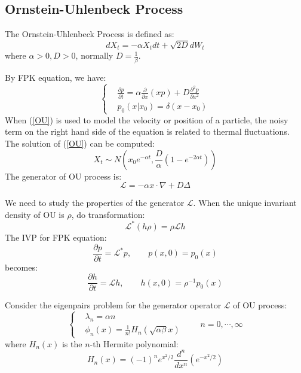 \subsection{Ornstein-Uhlenbeck Process}
\begin{definition}
    The Ornstein-Uhlenbeck Process is defined as:
    \begin{equation}
        dX_t = -\alpha X_t dt+\sqrt{2D} dW_t
    \end{equation}
    where $\alpha>0, D>0$, normally $D = \frac{1}{\beta}$.
\end{definition}
By FPK equation, we have:
\begin{equation}\left\{
    \begin{aligned}
        &\frac{\partial p}{\partial t} = \alpha \frac{\partial}{\partial x}(xp)+D\frac{\partial^2 p}{\partial x^2}\\
        &p_{0}(x|x_0) = \delta(x-x_0)
    \end{aligned}\right.\label{OU}
\end{equation}
When (\ref{OU}) is  used to model the velocity or position of a particle, the noisy term on the right hand side of the equation is related to thermal fluctuations.
The solution of (\ref{OU}) can be computed:
\begin{equation}
    X_t \sim N(x_0e^{-\alpha t}, \frac{D}{\alpha}(1-e^{-2\alpha t}))
\end{equation}
The generator of OU process is:
\begin{equation}
    \mathcal{L}=-\alpha x\cdot \nabla +D\Delta
\end{equation}

We need to study the properties of the generator $\mathcal{L}$. When the unique invariant density of OU is $\rho$, do transformation:
\begin{equation}
    \mathcal{L}^*(h\rho)=\rho \mathcal{L}h
\end{equation}
The IVP for FPK equation:
\begin{equation}
    \frac{\partial p}{\partial t}=\mathcal{L}^*p,\qquad p(x,0)=p_0(x)
\end{equation}
becomes:
\begin{equation}
    \frac{\partial h}{\partial t}=\mathcal{L}h,\qquad h(x,0)=\rho^{-1}p_0(x)
\end{equation}

\begin{theorem}
    Consider the eigenpairs problem for the generator operator $\mathcal{L}$ of OU process:
    \begin{equation}\left\{
        \begin{aligned}
            &\lambda_n = \alpha n\\
            &\phi_n(x) = \frac{1}{n!}H_n(\sqrt{\alpha \beta}x)
        \end{aligned}\right.\qquad n=0, \cdots, \infty \label{eigenpairs}
    \end{equation}
    where $H_n(x)$ is the $n$-th Hermite polynomial:
    \begin{equation}
        H_n(x) = (-1)^n e^{x^2/2}\frac{d^n}{dx^n}(e^{-x^2/2})
    \end{equation}
\end{theorem}


